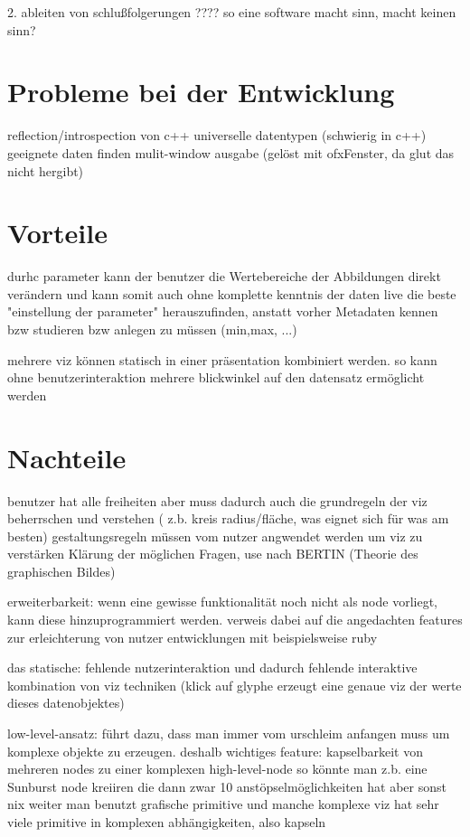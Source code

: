 \documentclass[a4paper, 12pt, DIVcalc, onepage, pdftex, headsepline, footsepline]{scrreprt}
\begin{document}
2. ableiten von schlußfolgerungen
????
so eine software macht sinn, macht keinen sinn?
\section{Probleme bei der Entwicklung}
\label{sec:Probleme}
reflection/introspection von c++
universelle datentypen (schwierig in c++)
geeignete daten finden
mulit-window ausgabe (gelöst mit ofxFenster, da glut das nicht hergibt)
\section{Vorteile}
\label{sec:Vorteile}
durhc parameter kann der benutzer die Wertebereiche der Abbildungen direkt verändern und kann somit auch ohne komplette kenntnis der daten live die beste "einstellung der parameter" herauszufinden, anstatt vorher Metadaten kennen bzw studieren bzw anlegen zu müssen (min,max, ...)

mehrere viz können statisch in einer präsentation kombiniert werden. so kann ohne benutzerinteraktion mehrere blickwinkel auf den datensatz ermöglicht werden

\section{Nachteile}
\label{sec:Nachteile}
benutzer hat alle freiheiten aber muss dadurch auch die grundregeln der viz beherrschen und verstehen ( z.b. kreis radius/fläche, was eignet sich für was am besten)
gestaltungsregeln müssen vom nutzer angwendet werden um viz zu verstärken
Klärung der möglichen Fragen, use nach BERTIN (Theorie des graphischen Bildes)

erweiterbarkeit:
wenn eine gewisse funktionalität noch nicht als node vorliegt, kann diese hinzuprogrammiert werden. verweis dabei auf die angedachten features zur erleichterung von nutzer entwicklungen mit beispielsweise ruby

das statische:
fehlende nutzerinteraktion und dadurch fehlende interaktive kombination von viz techniken (klick auf glyphe erzeugt eine genaue viz der werte dieses datenobjektes)

low-level-ansatz:
führt dazu, dass man immer vom urschleim anfangen muss um komplexe objekte zu erzeugen. deshalb wichtiges feature: kapselbarkeit von mehreren nodes zu einer komplexen high-level-node
so könnte man z.b. eine Sunburst node kreiiren die dann zwar 10 anstöpselmöglichkeiten hat aber sonst nix weiter
man benutzt grafische primitive und manche komplexe viz hat sehr viele primitive in komplexen abhängigkeiten, also kapseln
\end{document}
